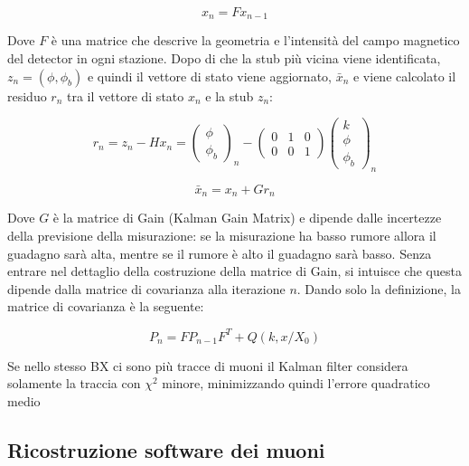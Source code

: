 \begin{equation}
  \label{eq:KalmanFilterEq}
    x_n = F x_{n-1}
\end{equation}

Dove $F$ è una matrice che descrive la geometria e l'intensità del campo magnetico del detector in ogni stazione.
Dopo di che la stub più vicina viene identificata, $z_n = (\phi, \phi_b)$ e quindi il vettore di stato viene aggiornato, $\bar{x}_n$ e viene calcolato il residuo $r_n$ tra il vettore di stato $x_n$ e la stub $z_n$: 

\begin{equation}
  \label{eq:KalmanFilterEq2}
    r_n = z_n - Hx_n = \left( \begin{matrix}
      \phi \\
      \phi_b
    \end{matrix}\right)_n - \left( \begin{matrix}
      0 & 1 & 0 \\ 
      0 & 0 & 1
    \end{matrix}\right)
    \left(\begin{matrix}
      k \\
      \phi \\
      \phi_b
    \end{matrix}\right)_n
\end{equation}

\begin{equation}
  \label{eq:KalmanFilterEq3}
    \bar{x}_n = x_n + Gr_n
\end{equation}

Dove $G$ è la matrice di Gain (Kalman Gain Matrix) e dipende dalle incertezze della previsione della misurazione: se la misurazione ha basso rumore allora il guadagno sarà alta, mentre se il rumore è alto il guadagno sarà basso. Senza entrare nel dettaglio della costruzione della matrice di Gain, si intuisce che questa dipende dalla matrice di covarianza alla iterazione $n$. Dando solo la definizione, la matrice di covarianza è la seguente:

\begin{equation}
  \label{eq:covariance}
  P_n = FP_{n-1}F^T + Q(k, x/X_0)
\end{equation}

Se nello stesso BX ci sono più tracce di muoni il Kalman filter considera solamente la traccia con $\chi^2$ minore, minimizzando quindi l'errore quadratico medio \cite{Summers:2728522}

\subsection{Ricostruzione software dei muoni}

